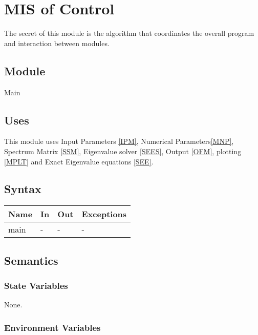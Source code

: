 \documentclass[12pt, titlepage]{article}
\begin{document}
\newpage 


\section{MIS of Control} \label{MCON}

The secret of this module is the algorithm that coordinates the overall program 
and 
interaction between modules.

\subsection{Module}

Main

\subsection{Uses}

This module uses Input Parameters \ref{IPM}, Numerical Parameters\ref{MNP}, 
Spectrum Matrix \ref{SSM}, 
Eigenvalue solver \ref{SEES},  Output \ref{OFM}, plotting \ref{MPLT} and Exact 
Eigenvalue equations \ref{SEE}.

\subsection{Syntax}

\begin{center}
	\begin{tabular}{p{2cm} p{6cm} p{6cm} p{3cm}}
		\hline
		\textbf{Name} & \textbf{In} & \textbf{Out} & \textbf{Exceptions} \\
		\hline
		main & - & - & - \\ 
		\hline
	\end{tabular}
\end{center}

\subsection{Semantics}

\subsubsection{State Variables}

None.

\subsubsection{Environment Variables}
\end{document}
